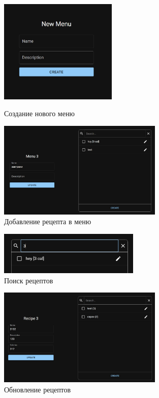 \begin{figure}[H]
  \centering
  \includegraphics[width=0.5\textwidth]{fig/project-3.jpg}
  \label{}
  \caption{Создание нового меню}
\end{figure}

\begin{figure}[H]
  \centering
  \includegraphics[width=0.7\textwidth]{fig/project-4.jpg}
  \caption{Добавление рецепта в меню}
\end{figure}

\begin{figure}[H]
  \centering
  \includegraphics[width=0.6\textwidth]{fig/project-5.jpg}
  \caption{Поиск рецептов}
\end{figure}

\begin{figure}[H]
  \centering
  \includegraphics[width=0.7\textwidth]{fig/project-6.jpg}
  \caption{Обновление рецептов}
\end{figure}

